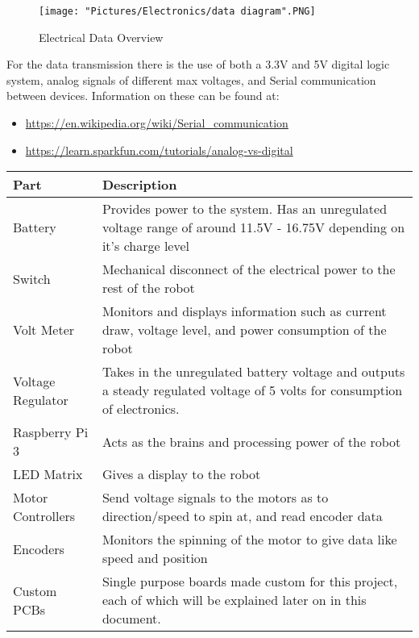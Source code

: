 \documentclass[12pt]{article}
\begin{document}
\begin{figure}[H]
  	\centering
   	\texttt{[image: "Pictures/Electronics/data diagram".PNG]}
  	\caption{Electrical Data Overview}
	\label{data}
\end{figure}

\noindent For the data transmission there is the use of both a 3.3V and 5V digital logic system, analog signals of different max voltages, and Serial communication between devices. Information on these can be found at:

\begin{itemize}
	\item \href{https://en.wikipedia.org/wiki/Serial_communication}{https://en.wikipedia.org/wiki/Serial\_communication}
	\item \href{https://learn.sparkfun.com/tutorials/analog-vs-digital}{https://learn.sparkfun.com/tutorials/analog-vs-digital}
\end{itemize}


\begin{tabular}[2]{|p{4cm}|p{11cm}|}
	\hline
	\textbf{Part} & \textbf{Description} \\ \hline
	Battery & Provides power to the system. Has an unregulated voltage range of around 11.5V - 16.75V depending on it's charge level \\ \hline
	Switch & Mechanical disconnect of the electrical power to the rest of the robot \\ \hline
	Volt Meter & Monitors and displays information such as current draw, voltage level, and power consumption of the robot \\ \hline
	Voltage Regulator & Takes in the unregulated battery voltage and outputs a steady regulated voltage of 5 volts for consumption of electronics. \\ \hline
	Raspberry Pi 3 & Acts as the brains and processing power of the robot \\ \hline
	LED Matrix & Gives a display to the robot \\ \hline
	Motor Controllers & Send voltage signals to the motors as to direction/speed to spin at, and read encoder data \\ \hline
	Encoders & Monitors the spinning of the motor to give data like speed and position \\ \hline
	Custom PCBs & Single purpose boards made custom for this project, each of which will be explained later on in this document. \\ \hline
\end{tabular}
\end{document}
